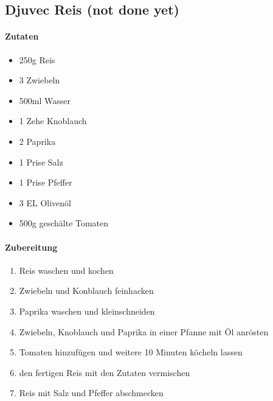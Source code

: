 
\newpage
\subsection{Djuvec Reis (not done yet)}
\paragraph{Zutaten}
\begin{itemize}[noitemsep]
	\item 250g Reis
	\item 3 Zwiebeln
	\item 500ml Wasser
	\item 1 Zehe Knoblauch
	\item 2 Paprika
	\item 1 Prise Salz
	\item 1 Prise Pfeffer
	\item 3 EL Olivenöl
	\item 500g geschälte Tomaten
\end{itemize}
\paragraph{Zubereitung}
\begin{enumerate}[noitemsep]
	\item Reis waschen und kochen
	\item Zwiebeln und Konblauch feinhacken
	\item Paprika waschen und kleinschneiden
	\item Zwiebeln, Knoblauch und Paprika in einer Pfanne mit Öl anrösten 
	\item Tomaten hinzufügen und weitere 10 Minuten köcheln lassen
	\item den fertigen Reis mit den Zutaten vermischen 
	\item Reis mit Salz und Pfeffer abschmecken
\end{enumerate}